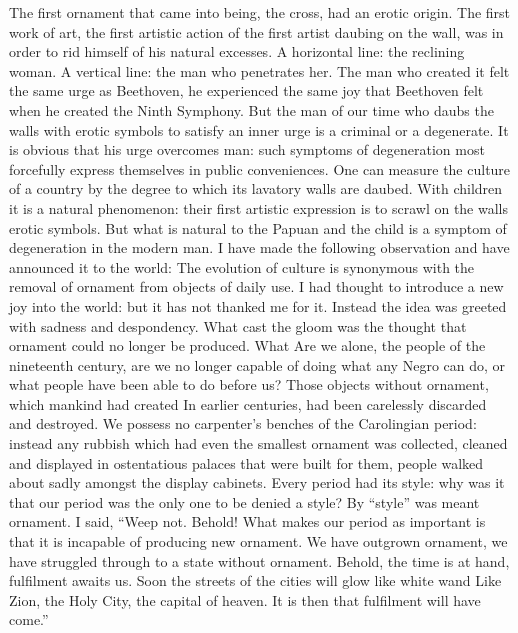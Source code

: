 \documentclass[a4paper]{article}
\begin{document}
The first ornament that came into being, the cross, had an erotic origin. The first work of art, the first artistic action of the first artist daubing on the wall, was in order to rid himself of his natural excesses. A horizontal line: the reclining woman. A vertical line: the man who penetrates her. The man who created it felt the same urge as Beethoven, he experienced the same joy that Beethoven felt when he created the Ninth Symphony.
But the man of our time who daubs the walls with erotic symbols to satisfy an inner urge is a criminal or a degenerate. It is obvious that his urge overcomes man: such symptoms of degeneration most forcefully express themselves in public conveniences. One can measure the culture of a country by the degree to which its lavatory walls are daubed. With children it is a natural phenomenon: their first artistic expression is to scrawl on the walls erotic symbols. But what is natural to the Papuan and the child is a symptom of degeneration in the modern man. I have made the following observation and have announced it to the world: The evolution of culture is synonymous with the removal of ornament from objects of daily use. I had thought to introduce a new joy into the world: but it has not thanked me for it. Instead the idea was greeted with sadness and despondency. What cast the gloom was the thought that ornament could no longer be produced. What Are we alone, the people of the nineteenth century, are we no longer capable of doing what any Negro can do, or what people have been able to do before us?
Those objects without ornament, which mankind had created In earlier centuries, had been carelessly discarded and destroyed. We possess no carpenter’s benches of the Carolingian period: instead any rubbish which had even the smallest ornament was collected, cleaned and displayed in ostentatious palaces that were built for them, people walked about sadly amongst the display cabinets. Every period had its style: why was it that our period was the only one to be denied a style? By “style” was meant ornament. I said, “Weep not. Behold! What makes our period as important is that it is incapable of producing new ornament. We have outgrown ornament, we have struggled through to a state without ornament. Behold, the time is at hand, fulfilment awaits us. Soon the streets of the cities will glow like white wand Like Zion, the Holy City, the capital of heaven. It is then that fulfilment will have come.”
\end{document}
